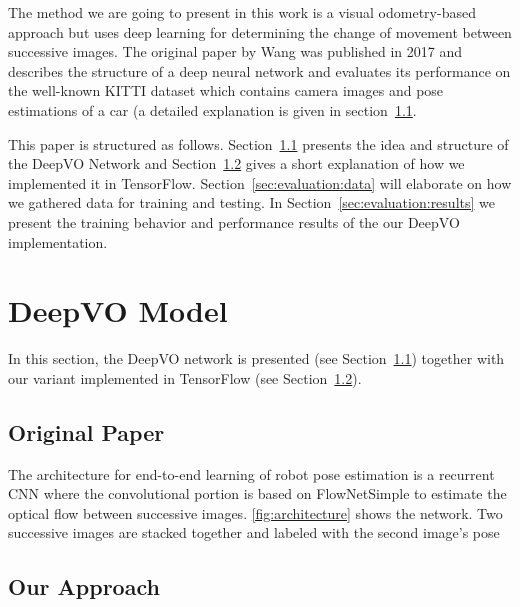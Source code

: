 \documentclass[a4paper,11pt]{article}
\begin{document}
The method we are going to present in this work is a visual odometry-based
approach but uses deep learning for determining the change of movement between
successive images. The original paper by Wang \etal{} \cite{wang2017deepvo} was
published in 2017 and describes the structure of a deep neural network
and evaluates its performance on the well-known KITTI dataset
which contains camera images and pose estimations of a car (a detailed
explanation is given in section~\ref{sec:deepvo:original}.

This paper is structured as follows. Section~\ref{sec:deepvo:original} presents
the idea and structure of the DeepVO Network and
Section~\ref{sec:deepvo:approach} gives a short explanation of how we
implemented it in TensorFlow. Section~\ref{sec:evaluation:data} will elaborate
on how we gathered data for training and testing. In
Section~\ref{sec:evaluation:results} we present the training behavior and
performance results of the our DeepVO implementation.


\section{DeepVO Model}
\label{sec:deepvo}
In this section, the DeepVO network is presented (see Section~\ref{sec:deepvo:original}) together with our variant implemented in TensorFlow (see Section~\ref{sec:deepvo:approach}).


\subsection{Original Paper}
\label{sec:deepvo:original}

The architecture for end-to-end learning of robot pose estimation is a recurrent
CNN where the convolutional portion is based on FlowNetSimple \citep{flownet} to
estimate the optical flow between successive images. \autoref{fig:architecture}
shows the network. Two successive images are stacked together and labeled with
the second image's pose


\subsection{Our Approach}
\label{sec:deepvo:approach}
\end{document}
